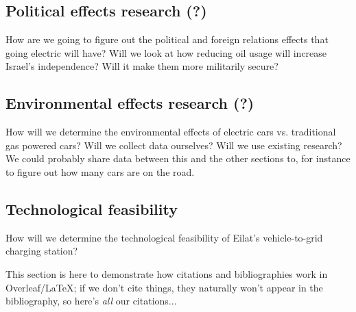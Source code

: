 \documentclass{article}                         %
\begin{document}
\subsection{Political effects research (?)}
How are we going to figure out the political and foreign relations effects that going electric will have? Will we look at how reducing oil usage will increase Israel's independence? Will it make them more militarily secure?

\subsection{Environmental effects research (?)}
How will we determine the environmental effects of electric cars vs. traditional gas powered cars? Will we collect data ourselves? Will we use existing research? We could probably share data between this and the other sections to, for instance to figure out how many cars are on the road.

\subsection{Technological feasibility}
How will we determine the technological feasibility of Eilat's vehicle-to-grid charging station?

\bigskip
This section is here to demonstrate how citations and bibliographies work in Overleaf/\LaTeX; if we don't cite things, they naturally won't appear in the bibliography, so here's \textit{all} our citations...

\cite{Cheslow2011BetterCountry, Zhu2015DistributedGrid, Bennett2015EconomicGrid, Shinde2018ElectricInfrastructure, Ustun2015ImpactSystems, Ustun2015ImpactSystems, Lu2015IntroductionPEVs, OraCorenIsraelLane, Larkin2008IsraelsDependence, IsraeliMinistryofEnergyIsraelsEconomy, Leskarac2015PEVOn, Rahman2015PowerEVs, Rahman2015PowerEVs, Mahmud2015PowerEV, Mullan2012TheConcept}

\newpage


\end{document}
